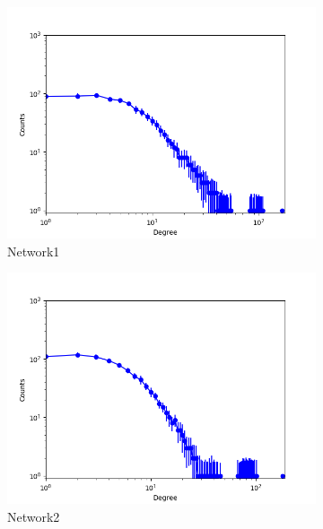 
\begin{figure}[h]
        \centering
        \begin{subfigure}[b]{0.300\textwidth}
            \centering
            \includegraphics[width=\textwidth]{img/corpus/ilfm_network1_0}
            \caption {{\small Network1}}    
        \end{subfigure}
        \begin{subfigure}[b]{0.300\textwidth}
            \centering
            \includegraphics[width=\textwidth]{img/corpus/ilfm_network2_0}
            \caption {{\small Network2}}    
        \end{subfigure}
        \begin{subfigure}[b]{0.300\textwidth}

\end{subfigure}
\end{figure}
